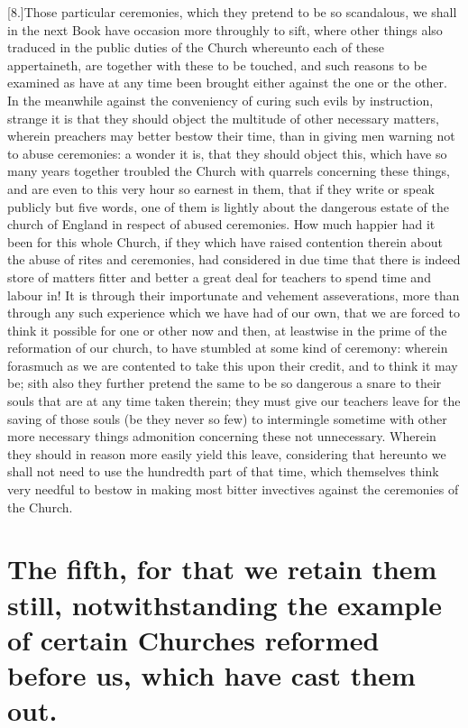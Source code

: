 [8.]Those particular ceremonies, which they pretend to be so scandalous, we shall in the next Book have occasion more throughly to sift, where other things also traduced in the public duties of the Church whereunto each of these appertaineth, are together with these to be touched, and such reasons to be examined as have at any time been brought either against the one or the other. In the meanwhile against the conveniency of curing such evils by instruction, strange it is that they should object the multitude of other necessary matters, wherein preachers may better bestow their time, than in giving men warning not to abuse ceremonies: a wonder it is, that they should object this, which have so many years together troubled the Church with quarrels concerning these things, and are even to this very hour so earnest in them, that if they write or speak publicly but five words, one of them is lightly about the dangerous estate of the church of England in respect of abused ceremonies. How much happier had it been for this whole Church, if they which have raised contention therein about the abuse of rites and ceremonies, had considered in due time that there is indeed store of matters fitter and better a great deal for teachers to spend time and labour in! It is through their importunate and vehement asseverations, more than through any such experience which we have had of our own, that we are forced to think it possible for one or other now and then, at leastwise in the prime of the reformation of our church, to have stumbled at some kind of ceremony: wherein forasmuch as we are contented to take this upon their credit, and to think it may be; sith also they further pretend the same to be so dangerous a snare to their souls that are at any time  taken therein; they must give our teachers leave for the saving of those souls (be they never so few) to intermingle sometime with other more necessary things admonition concerning these not unnecessary. Wherein they should in reason more easily yield this leave, considering that hereunto we shall not need to use the hundredth part of that time, which themselves think very needful to bestow in making most bitter invectives against the ceremonies of the Church.

\section*{The fifth, for that we retain them still, notwithstanding the example of certain Churches reformed before us, which have cast them out.}

